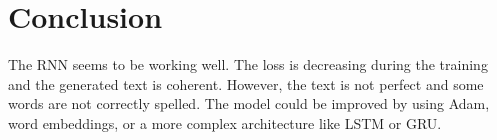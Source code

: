 \documentclass{article}
\begin{document}
\section*{Conclusion}

The RNN seems to be working well. The loss is decreasing during the training and the generated text is coherent. However, the text is not perfect and some words are not correctly spelled. The model could be improved by using Adam, word embeddings, or a more complex architecture like LSTM or GRU.
\end{document}
